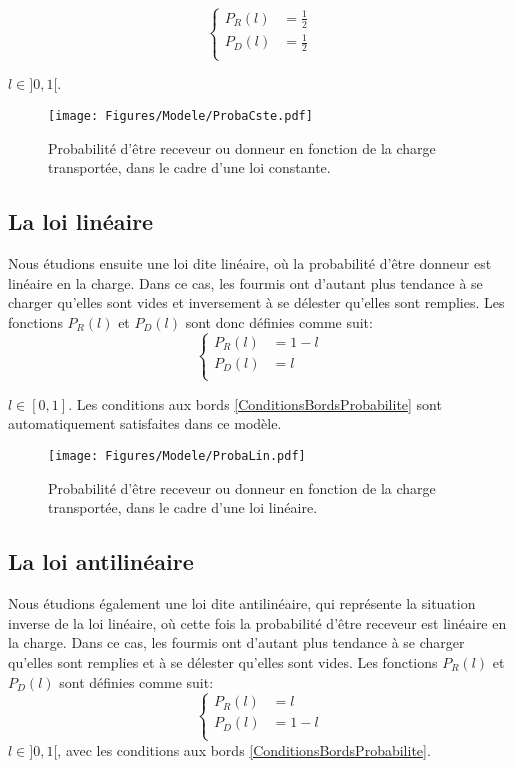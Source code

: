 \begin{equation}
\left \{
\begin{aligned}
P_R (l) &= \frac{1}{2}\\
P_D (l) &= \frac{1}{2}\\
\end{aligned}
\right.
\label{PRCste}
\end{equation}

$l\in]0,1[$.

\begin{figure}[h]
\centering
\texttt{[image: Figures/Modele/ProbaCste.pdf]}
\caption{Probabilité d'être receveur ou donneur en fonction de la charge transportée, dans le cadre d'une loi constante.}
\label{ProbaCste}
\end{figure}

\subsection{La loi linéaire}
Nous étudions ensuite une loi dite linéaire, où la probabilité d'être donneur est linéaire en la charge. Dans ce cas, les fourmis ont d'autant plus tendance à se charger qu'elles sont vides et inversement à se délester qu'elles sont remplies. Les fonctions $P_R(l)$ et $P_D(l)$ sont donc définies comme suit:
\begin{equation}
\left \{
\begin{aligned}
P_R (l) &= 1-l\\
P_D (l) &= l\\
\end{aligned}
\right.
\label{PRLin}
\end{equation}

$l\in[0,1]$. Les conditions aux bords \ref{ConditionsBordsProbabilite} sont automatiquement satisfaites dans ce modèle.

\begin{figure}[h]
\centering
\texttt{[image: Figures/Modele/ProbaLin.pdf]}
\caption{Probabilité d'être receveur ou donneur en fonction de la charge transportée, dans le cadre d'une loi linéaire.}
\label{ProbaLin}
\end{figure}


\subsection{La loi antilinéaire}
Nous étudions également une loi dite antilinéaire, qui représente la situation inverse de la loi linéaire, où cette fois la probabilité d'être receveur est linéaire en la charge. Dans ce cas, les fourmis ont d'autant plus tendance à se charger qu'elles sont remplies et à se délester qu'elles sont vides. Les fonctions $P_R(l)$ et $P_D(l)$ sont définies comme suit:
\begin{equation}
\left \{
\begin{aligned}
P_R (l) &= l\\
P_D (l) &= 1-l\\
\end{aligned}
\right.
\label{PRAnti}
\end{equation}
$l\in]0,1[$, avec les conditions aux bords \ref{ConditionsBordsProbabilite}.

